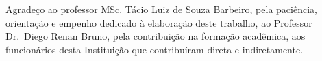 \begin{agradecimentos}[AGRADECIMENTOS]

    Agradeço ao professor MSc. Tácio Luiz de Souza Barbeiro, pela paciência,
    orientação e empenho dedicado à elaboração deste trabalho, ao Professor
    Dr.\ Diego Renan Bruno, pela contribuição na formação acadêmica, aos
    funcionários desta Instituição que contribuíram direta e indiretamente.

\end{agradecimentos}
